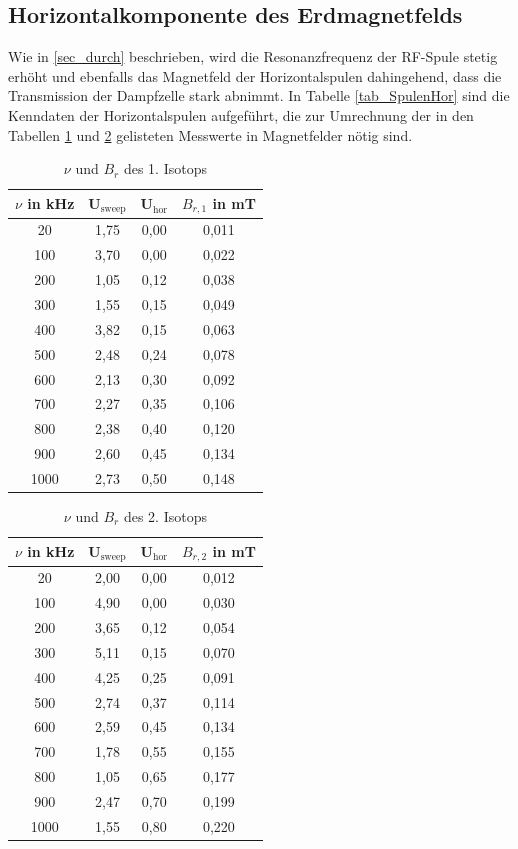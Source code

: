 \subsection{Horizontalkomponente des Erdmagnetfelds}
Wie in \ref{sec_durch} beschrieben, wird die Resonanzfrequenz der RF-Spule stetig erhöht und ebenfalls das Magnetfeld der Horizontalspulen dahingehend,
dass die Transmission der Dampfzelle stark abnimmt. In Tabelle \ref{tab_SpulenHor} sind die Kenndaten der Horizontalspulen aufgeführt, die zur Umrechnung
der in den Tabellen \ref{tab_nuB1} und \ref{tab_nuB2} gelisteten Messwerte in Magnetfelder nötig sind.


\begin{minipage}{0.5\textwidth}
\begin{table}[H]
\begin{tabular}{c|cc|c}
$\nu$ in kHz & U$_{\text{sweep}}$ & U$_{\text{hor}}$ & $B_{r,1}$ in mT\\
\hline
 20 &	1,75&	0,00&	0,011\\
100&	3,70&	0,00&	0,022\\
200&	1,05&	0,12&	0,038\\
300&	1,55&	0,15&	0,049\\
400&	3,82&	0,15&	0,063\\
500&	2,48&	0,24&	0,078\\
600&	2,13&	0,30&	0,092\\
700&	2,27&	0,35&	0,106\\
800&	2,38&	0,40&	0,120\\
900&	2,60&	0,45&	0,134\\
1000&	2,73&	0,50&	0,148 \\
\end{tabular}
\caption{$\nu$ und $B_r$ des 1. Isotops}
\label{tab_nuB1}
\end{table}
\end{minipage}
\begin{minipage}{0,5\textwidth}
\begin{table}[H]
\begin{tabular}{c|cc|c}
$\nu$ in kHz & U$_{\text{sweep}}$ & U$_{\text{hor}}$ & $B_{r,2}$ in mT\\
\hline
20	&2,00&	0,00&	0,012\\
100&	4,90&	0,00&	0,030\\
200&	3,65&	0,12&	0,054\\
300&	5,11&	0,15&	0,070\\
400&	4,25&	0,25&	0,091\\
500&	2,74&	0,37&	0,114\\
600&	2,59&	0,45&	0,134\\
700&	1,78&	0,55&	0,155\\
800&	1,05&	0,65&	0,177\\
900&	2,47&	0,70&	0,199\\
1000&	1,55&	0,80&	0,220 \\
\end{tabular}
\caption{$\nu$ und $B_r$ des 2. Isotops}
\label{tab_nuB2}
\end{table}
\end{minipage}

